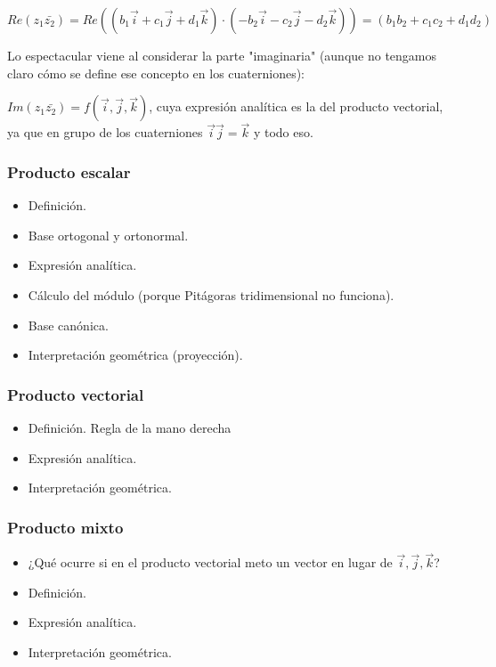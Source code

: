 \newcommand{\quat}{\vec}

$Re(z_1\bar{z_2}) = Re\left((b_1\quat{i}+c_1\quat{j}+d_1\quat{k})·(-b_2\quat{i}-c_2\quat{j}-d_2\quat{k})\right) = (b_1b_2+c_1c_2+d_1d_2)$

Lo espectacular viene al considerar la parte "imaginaria" (aunque no tengamos claro cómo se define ese concepto en los cuaterniones):

$Im(z_1\bar{z_2}) = f(\quat{i},\quat{j},\quat{k})$, cuya expresión analítica es la del producto vectorial, ya que en grupo de los cuaterniones $\quat{i}\quat{j}=\quat{k}$ y todo eso.

\subsubsection{Producto escalar}

\begin{itemize}
  \item Definición.
  \item Base ortogonal y ortonormal.
  \item Expresión analítica.
  \item Cálculo del módulo (porque Pitágoras tridimensional no funciona).
  \item Base canónica.
  \item Interpretación geométrica (proyección).
\end{itemize}

\subsubsection{Producto vectorial}
\begin{itemize}
  \item Definición.
  \subitem Regla de la mano derecha
  \item Expresión analítica.
  \item Interpretación geométrica. 
\end{itemize}


\subsubsection{Producto mixto}

\begin{itemize}
  \item ¿Qué ocurre si en el producto vectorial meto un vector en lugar de $\vec{i},\vec{j},\vec{k}$?
  \item Definición.
  \item Expresión analítica.
  \item Interpretación geométrica. 
\end{itemize}

